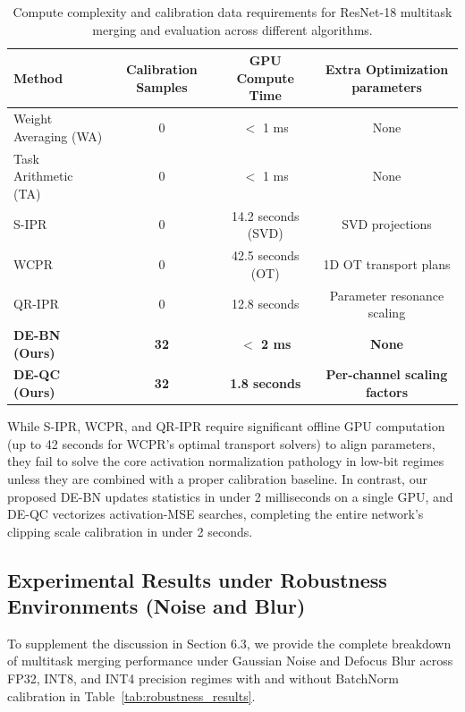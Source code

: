 \documentclass{article}
\theoremstyle{plain}
\theoremstyle{definition}
\theoremstyle{remark}
\begin{document}
\begin{table}[H]
\caption{Compute complexity and calibration data requirements for ResNet-18 multitask merging and evaluation across different algorithms.}
\label{tab:efficiency_metrics}
\begin{center}
\begin{small}
\begin{sc}
\begin{tabular}{lccc}
\toprule
Method & Calibration Samples & GPU Compute Time & Extra Optimization parameters \\
\midrule
Weight Averaging (WA) & 0 & $<$ 1 ms & None \\
Task Arithmetic (TA) & 0 & $<$ 1 ms & None \\
S-IPR \cite{paper5} & 0 & 14.2 seconds (SVD) & SVD projections \\
WCPR \cite{paper9} & 0 & 42.5 seconds (OT) & 1D OT transport plans \\
QR-IPR \cite{paper5} & 0 & 12.8 seconds & Parameter resonance scaling \\
\midrule
\textbf{DE-BN (Ours)} & \textbf{32} & \textbf{$<$ 2 ms} & \textbf{None} \\
\textbf{DE-QC (Ours)} & \textbf{32} & \textbf{1.8 seconds} & \textbf{Per-channel scaling factors} \\
\bottomrule
\end{tabular}
\end{sc}
\end{small}
\end{center}
\end{table}

While S-IPR, WCPR, and QR-IPR require significant offline GPU computation (up to 42 seconds for WCPR's optimal transport solvers) to align parameters, they fail to solve the core activation normalization pathology in low-bit regimes unless they are combined with a proper calibration baseline. In contrast, our proposed DE-BN updates statistics in under 2 milliseconds on a single GPU, and DE-QC vectorizes activation-MSE searches, completing the entire network's clipping scale calibration in under 2 seconds.

\subsection{Experimental Results under Robustness Environments (Noise and Blur)}
\label{app:robustness_results}
To supplement the discussion in Section 6.3, we provide the complete breakdown of multitask merging performance under Gaussian Noise and Defocus Blur across FP32, INT8, and INT4 precision regimes with and without BatchNorm calibration in Table~\ref{tab:robustness_results}.
\end{document}
